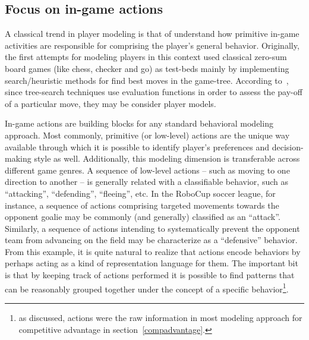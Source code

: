\subsection{Focus on in-game actions}
A classical trend in player modeling is that of understand how primitive in-game activities are responsible for comprising the player's general behavior. Originally, the first attempts for modeling players in this context used classical zero-sum board games (like chess, checker and go) as test-beds mainly by implementing search/heuristic methods for find best moves in the game-tree. According to~\cite{bakkes_player_2012}, since tree-search techniques use evaluation functions in order to assess the pay-off of a particular move, they may be consider player models.

In-game actions are building blocks for any standard behavioral modeling approach. Most commonly, primitive (or low-level) actions are the unique way available through which it is possible to identify player's preferences and decision-making style as well. Additionally, this modeling dimension is transferable across different game genres. A sequence of low-level actions -- such as moving to one direction to another -- is generally related with a classifiable behavior, such as ``attacking'', ``defending'', ``fleeing'', etc. In the RoboCup soccer league, for instance, a sequence of actions comprising targeted movements towards the opponent goalie may be commonly (and generally) classified as an ``attack''. Similarly, a sequence of actions intending to systematically prevent the opponent team from advancing on the field may be characterize as a ``defensive'' behavior. From this example, it is quite natural to realize that actions encode behaviors by perhaps acting as a kind of representation language for them. The important bit is that by keeping track of actions performed it is possible to find patterns that can be reasonably grouped together under the concept of a specific behavior\footnote{as discussed, actions were the raw information in most modeling approach for competitive advantage in section~\ref{compadvantage}.}.

